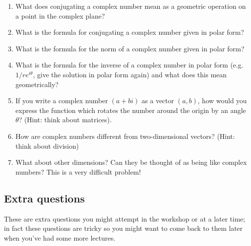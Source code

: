\documentclass[11pt,a4paper]{scrartcl}
\begin{document}
	\begin{enumerate}
		\item What does conjugating a complex number mean as a geometric operation on a point in the complex plane?
		\item What is the formula for conjugating a complex number given in polar form?
		\item What is the formula for the norm of a complex number given in polar form?
		\item What is the formula for the inverse of a complex number in polar form (e.g. $1/re^{i\theta}$, give the
		solution in polar form again) and what does this mean geometrically?
	      \item If you write a complex number $(a+bi)$ as a vector $(a,b)$, how would you express the function which rotates the number around the origin by an angle $\theta$? (Hint: think about matrices).
              \item How are complex numbers different from two-dimensional vectors? (Hint: think about division)
              \item What about other dimensions? Can they be thought of as being like complex numbers? This is a very difficult problem!
	\end{enumerate}


\subsection*{Extra questions}

These are extra questions you might attempt in the workshop or at a
later time; in fact these questions are tricky so you might want to
come back to them later when you've had some more lectures.
\end{document}
